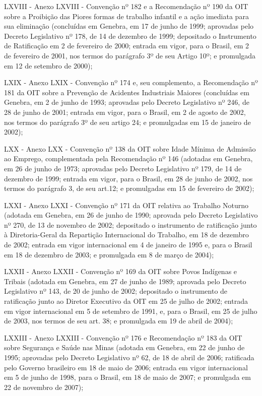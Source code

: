 \documentclass[
]{book}
\begin{document}
LXVIII - Anexo LXVIII - Convenção nº 182 e a Recomendação nº 190 da OIT sobre a Proibição das Piores formas de trabalho infantil e a ação imediata para sua eliminação (concluídas em Genebra, em 17 de junho de 1999; aprovadas pelo Decreto Legislativo nº 178, de 14 de dezembro de 1999; depositado o Instrumento de Ratificação em 2 de fevereiro de 2000; entrada em vigor, para o Brasil, em 2 de fevereiro de 2001, nos termos do parágrafo 3º de seu Artigo 10º; e promulgada em 12 de setembro de 2000);

LXIX - Anexo LXIX - Convenção nº 174 e, seu complemento, a Recomendação nº 181 da OIT sobre a Prevenção de Acidentes Industriais Maiores (concluídas em Genebra, em 2 de junho de 1993; aprovadas pelo Decreto Legislativo nº 246, de 28 de junho de 2001; entrada em vigor, para o Brasil, em 2 de agosto de 2002, nos termos do parágrafo 3º de seu artigo 24; e promulgadas em 15 de janeiro de 2002);

LXX - Anexo LXX - Convenção nº 138 da OIT sobre Idade Mínima de Admissão ao Emprego, complementada pela Recomendação nº 146 (adotadas em Genebra, em 26 de junho de 1973; aprovadas pelo Decreto Legislativo nº 179, de 14 de dezembro de 1999; entrada em vigor, para o Brasil, em 28 de junho de 2002, nos termos do parágrafo 3, de seu art.12; e promulgadas em 15 de fevereiro de 2002);

LXXI - Anexo LXXI - Convenção nº 171 da OIT relativa ao Trabalho Noturno (adotada em Genebra, em 26 de junho de 1990; aprovada pelo Decreto Legislativo nº 270, de 13 de novembro de 2002; depositado o instrumento de ratificação junto à Diretoria-Geral da Repartição Internacional do Trabalho, em 18 de dezembro de 2002; entrada em vigor internacional em 4 de janeiro de 1995 e, para o Brasil em 18 de dezembro de 2003; e promulgada em 8 de março de 2004);

LXXII - Anexo LXXII - Convenção nº 169 da OIT sobre Povos Indígenas e Tribais (adotada em Genebra, em 27 de junho de 1989; aprovada pelo Decreto Legislativo nº 143, de 20 de junho de 2002; depositado o instrumento de ratificação junto ao Diretor Executivo da OIT em 25 de julho de 2002; entrada em vigor internacional em 5 de setembro de 1991, e, para o Brasil, em 25 de julho de 2003, nos termos de seu art. 38; e promulgada em 19 de abril de 2004);

LXXIII - Anexo LXXIII - Convenção nº 176 e Recomendação nº 183 da OIT sobre Segurança e Saúde nas Minas (adotada em Genebra, em 22 de junho de 1995; aprovadas pelo Decreto Legislativo nº 62, de 18 de abril de 2006; ratificada pelo Governo brasileiro em 18 de maio de 2006; entrada em vigor internacional em 5 de junho de 1998, para o Brasil, em 18 de maio de 2007; e promulgada em 22 de novembro de 2007);
\end{document}
